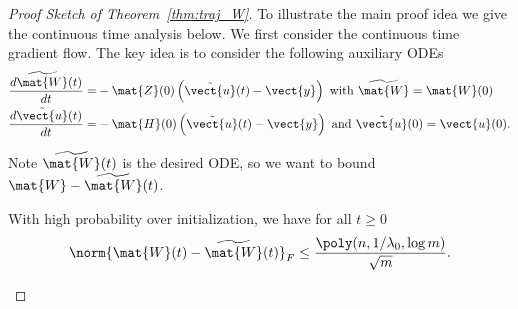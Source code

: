 \begin{proof}[Proof Sketch of Theorem~\ref{thm:traj_W}]
	To illustrate the main proof idea we give the continuous time analysis below.
	We first consider the continuous time gradient flow.
	The key idea is to consider the following auxiliary ODEs\begin{align*}
	\frac{d\widetilde{\mat{W}}(t)}{dt} = &- \mat{Z}(0) \left(\tilde{\vect{u}}(t)-\vect{y}\right) \text{ with } \widetilde{\mat{W}} = \mat{W}(0) \\
	\frac{d\tilde{\vect{u}}(t)}{dt} = &- \mat{H}(0)\left(\tilde{\vect{u}}(t)-\vect{y}\right) \text{ and }\tilde{\vect{u}}(0) = \vect{u}(0).
	\end{align*} 
	
	Note $\widetilde{\mat{W}}(t)$ is the desired ODE, so we want to bound $\mat{W}-\widetilde{\mat{W}}(t)$.
	\begin{lem}\label{lem:gf_optimization}
		With high probability over initialization, we have for all $t\ge 0$\begin{align*}
		\norm{\mat{W}(t)-\widetilde{\mat{W}}(t)}_F \le \frac{\poly(n,1/\lambda_0,\log m)}{\sqrt{m}}.
		\end{align*}
	\end{lem}
	
	
	

\end{proof}
